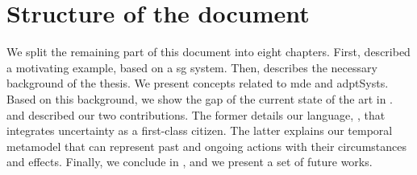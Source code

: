 \section{Structure of the document}

We split the remaining part of this document into eight chapters.
First,  described a motivating example, based on a \gls{sg} system.
Then,  describes the necessary background of the thesis.
We present concepts related to \gls{mde} and \glspl{adptSyst}.
Based on this background, we show the gap of the current state of the art in .
 and  described our two contributions.
The former details our language, \langName, that integrates uncertainty as a first-class citizen.
The latter explains our temporal \gls{metamodel} that can represent past and ongoing \glspl{action} with their circumstances and effects.
Finally, we conclude in , and we present a set of future works.